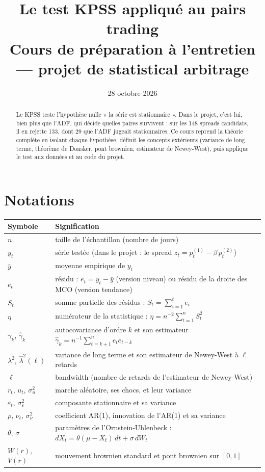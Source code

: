 \documentclass[11pt,a4paper]{article}
\title{\textbf{Le test KPSS appliqué au pairs trading}\\[0.3em]
\large Cours de préparation à l'entretien --- projet de statistical arbitrage}
\date{28 octobre 2026}
\author{}
\theoremstyle{definition}
\begin{document}
\maketitle

\begin{abstract}
Le KPSS teste l'hypothèse nulle « la série est stationnaire ». Dans le projet, c'est lui, bien plus que l'ADF, qui décide quelles paires survivent : sur les 148 spreads candidats, il en rejette 133, dont 29 que l'ADF jugeait stationnaires. Ce cours reprend la théorie complète en isolant chaque hypothèse, définit les concepts extérieurs (variance de long terme, théorème de Donsker, pont brownien, estimateur de Newey-West), puis applique le test aux données et au code du projet.
\end{abstract}

\tableofcontents

\section*{Notations}

\begin{center}
\begin{tabularx}{\textwidth}{@{}lX@{}}
\toprule
Symbole & Signification \\
\midrule
$n$ & taille de l'échantillon (nombre de jours) \\
$y_t$ & série testée (dans le projet : le spread $z_t = p^{(1)}_t - \beta\,p^{(2)}_t$) \\
$\bar y$ & moyenne empirique de $y_t$ \\
$e_t$ & résidu : $e_t = y_t - \bar y$ (version niveau) ou résidu de la droite des MCO (version tendance) \\
$S_t$ & somme partielle des résidus : $S_t = \sum_{i=1}^{t} e_i$ \\
$\eta$ & numérateur de la statistique : $\eta = n^{-2}\sum_{t=1}^{n} S_t^2$ \\
$\gamma_k$, $\hat\gamma_k$ & autocovariance d'ordre $k$ et son estimateur $\hat\gamma_k = n^{-1}\sum_{t=k+1}^{n} e_t e_{t-k}$ \\
$\lambda^2$, $\hat\lambda^2(\ell)$ & variance de long terme et son estimateur de Newey-West à $\ell$ retards \\
$\ell$ & bandwidth (nombre de retards de l'estimateur de Newey-West) \\
$r_t$, $u_t$, $\sigma_u^2$ & marche aléatoire, ses chocs, et leur variance \\
$\varepsilon_t$, $\sigma_\varepsilon^2$ & composante stationnaire et sa variance \\
$\rho$, $\nu_t$, $\sigma_\nu^2$ & coefficient AR(1), innovation de l'AR(1) et sa variance \\
$\theta$, $\sigma$ & paramètres de l'Ornstein-Uhlenbeck : $dX_t = \theta(\mu - X_t)\,dt + \sigma\,dW_t$ \\
$W(r)$, $V(r)$ & mouvement brownien standard et pont brownien sur $[0,1]$ \\
\bottomrule
\end{tabularx}
\end{center}
\end{document}
